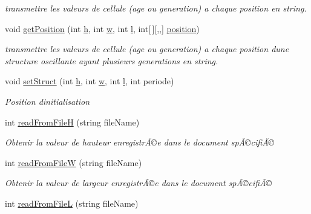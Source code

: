 \begin{DoxyCompactItemize}
\begin{DoxyCompactList}\small\item\em transmettre les valeurs de cellule (age ou generation) a chaque position en string. \end{DoxyCompactList}\item 
void \mbox{\hyperlink{class_local_storage_ab5a516f6f13a01e683b6b1c56b373937}{get\+Position}} (int \mbox{\hyperlink{class_local_storage_ab025e3ab66a812167b739de8f636e72f}{h}}, int \mbox{\hyperlink{class_local_storage_abac4c0cb7803f4f4438aba6a02a9eba2}{w}}, int \mbox{\hyperlink{class_local_storage_a37e93f37b061a398e9d3cbfaf4c7fecd}{l}}, int\mbox{[}$\,$\mbox{]}\mbox{[},,\mbox{]} \mbox{\hyperlink{class_local_storage_a135431eb0ae788b698b206b3cf12130d}{position}})
\begin{DoxyCompactList}\small\item\em transmettre les valeurs de cellule (age ou generation) a chaque position d\textquotesingle{}une structure oscillante ayant plusieurs generations en string. \end{DoxyCompactList}\item 
void \mbox{\hyperlink{class_local_storage_aca462b162e1e7185526f4282a7838f40}{set\+Struct}} (int \mbox{\hyperlink{class_local_storage_ab025e3ab66a812167b739de8f636e72f}{h}}, int \mbox{\hyperlink{class_local_storage_abac4c0cb7803f4f4438aba6a02a9eba2}{w}}, int \mbox{\hyperlink{class_local_storage_a37e93f37b061a398e9d3cbfaf4c7fecd}{l}}, int periode)
\begin{DoxyCompactList}\small\item\em Position d\textquotesingle{}initialisation \end{DoxyCompactList}\item 
int \mbox{\hyperlink{class_local_storage_ab0e31baa14b85dc8a8bd21aa1d53ab09}{read\+From\+FileH}} (string file\+Name)
\begin{DoxyCompactList}\small\item\em Obtenir la valeur de hauteur enregistrÃ©e dans le document spÃ©cifiÃ© \end{DoxyCompactList}\item 
int \mbox{\hyperlink{class_local_storage_aef684ee38f8d4dccf157503ec6d04a7a}{read\+From\+FileW}} (string file\+Name)
\begin{DoxyCompactList}\small\item\em Obtenir la valeur de largeur enregistrÃ©e dans le document spÃ©cifiÃ© \end{DoxyCompactList}\item 
int \mbox{\hyperlink{class_local_storage_a2216bc871c8298023f62119bcdf7edb4}{read\+From\+FileL}} (string file\+Name)

\end{DoxyCompactItemize}
